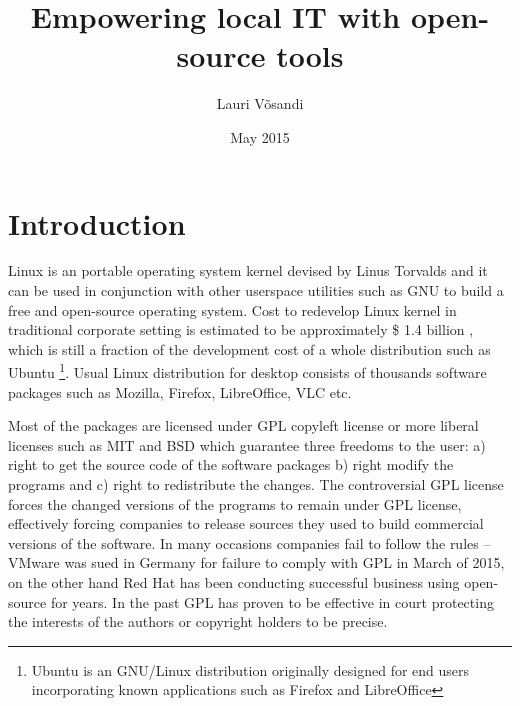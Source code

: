 \documentclass{article}
\title{Empowering local IT with open-source tools}
\author{Lauri Võsandi}
\date{May 2015}
\begin{document}
\maketitle

\section{Introduction}

Linux is an portable operating system kernel
\cite{linux-a-portable-operating-system} devised
by Linus Torvalds and it can be used in conjunction with other
userspace utilities such as GNU \cite{free-software-free-society} to build
a free and open-source operating system.
Cost to redevelop Linux kernel in traditional corporate setting
is estimated to be approximately \$ 1.4 billion
\cite{estimating-cost-of-linux-distro}, which is still a fraction
of the development cost of a whole distribution such as Ubuntu
\footnote{Ubuntu is an GNU/Linux distribution originally
designed for end users incorporating known applications such as Firefox and LibreOffice}.
Usual Linux distribution for desktop consists of thousands software packages
such as Mozilla, Firefox, LibreOffice, VLC etc.

Most of the packages are licensed under
GPL \cite{general-public-license} copyleft license or
more liberal licenses such as
MIT \cite{the-mit-license} and
BSD \cite{the-bsd-2-clause-license} \cite{the-bsd-3-clause-license}
which guarantee
three freedoms to the user:
a) right to get the source code of the software packages
b) right modify the programs and
c) right to redistribute the changes.
The controversial GPL license forces the changed versions
of the programs to remain under GPL license,
effectively forcing companies to release sources they
used to build commercial versions of the software.
In many occasions companies fail to follow the
rules  --
VMware was sued in Germany for failure to comply with GPL
\cite{vmware-sued} in March of 2015,
on the other hand Red Hat has been conducting
successful business using open-source for years.
In the past GPL has proven to be effective in court protecting
the interests of the authors or copyright holders to be precise.
\end{document}
